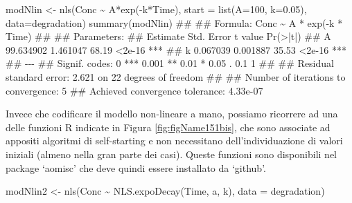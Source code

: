 \documentclass[a4paper,12pt,oneside]{book}
\newenvironment{Shaded}{\begin{snugshade}}{\end{snugshade}}
\newcommand{\DecValTok}[1]{#1}
\newcommand{\FloatTok}[1]{#1}
\newcommand{\SpecialCharTok}[1]{#1}
\newcommand{\DocumentationTok}[1]{#1}
\newcommand{\OtherTok}[1]{#1}
\newcommand{\FunctionTok}[1]{#1}
\newcommand{\AttributeTok}[1]{#1}
\newcommand{\NormalTok}[1]{#1}
\begin{document}
\begin{Shaded}
\begin{Highlighting}[]
\NormalTok{modNlin }\OtherTok{\textless{}{-}} \FunctionTok{nls}\NormalTok{(Conc }\SpecialCharTok{\textasciitilde{}}\NormalTok{ A}\SpecialCharTok{*}\FunctionTok{exp}\NormalTok{(}\SpecialCharTok{{-}}\NormalTok{k}\SpecialCharTok{*}\NormalTok{Time), }
               \AttributeTok{start =} \FunctionTok{list}\NormalTok{(}\AttributeTok{A=}\DecValTok{100}\NormalTok{, }\AttributeTok{k=}\FloatTok{0.05}\NormalTok{), }
               \AttributeTok{data=}\NormalTok{degradation)}
\FunctionTok{summary}\NormalTok{(modNlin)}
\DocumentationTok{\#\# }
\DocumentationTok{\#\# Formula: Conc \textasciitilde{} A * exp({-}k * Time)}
\DocumentationTok{\#\# }
\DocumentationTok{\#\# Parameters:}
\DocumentationTok{\#\#    Estimate Std. Error t value Pr(\textgreater{}|t|)    }
\DocumentationTok{\#\# A 99.634902   1.461047   68.19   \textless{}2e{-}16 ***}
\DocumentationTok{\#\# k  0.067039   0.001887   35.53   \textless{}2e{-}16 ***}
\DocumentationTok{\#\# {-}{-}{-}}
\DocumentationTok{\#\# Signif. codes:  0 \textquotesingle{}***\textquotesingle{} 0.001 \textquotesingle{}**\textquotesingle{} 0.01 \textquotesingle{}*\textquotesingle{} 0.05 \textquotesingle{}.\textquotesingle{} 0.1 \textquotesingle{} \textquotesingle{} 1}
\DocumentationTok{\#\# }
\DocumentationTok{\#\# Residual standard error: 2.621 on 22 degrees of freedom}
\DocumentationTok{\#\# }
\DocumentationTok{\#\# Number of iterations to convergence: 5 }
\DocumentationTok{\#\# Achieved convergence tolerance: 4.33e{-}07}
\end{Highlighting}
\end{Shaded}

Invece che codificare il modello non-lineare a mano, possiamo ricorrere ad una delle funzioni R indicate in Figura \ref{fig:figName151bis}, che sono associate ad appositi algoritmi di self-starting e non necessitano dell'individuazione di valori iniziali (almeno nella gran parte dei casi). Queste funzioni sono disponibili nel package `aomisc' che deve quindi essere installato da `github'.

\begin{Shaded}
\begin{Highlighting}[]
\NormalTok{modNlin2 }\OtherTok{\textless{}{-}} \FunctionTok{nls}\NormalTok{(Conc }\SpecialCharTok{\textasciitilde{}} \FunctionTok{NLS.expoDecay}\NormalTok{(Time, a, k),}
               \AttributeTok{data =}\NormalTok{ degradation)}
\end{Highlighting}
\end{Shaded}
\end{document}
